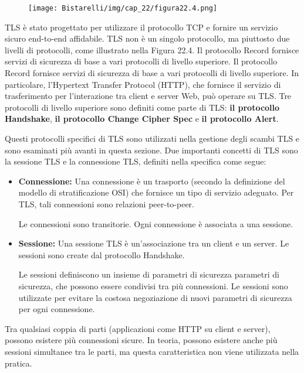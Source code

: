 \begin{figure}[H]
	\centering
    \texttt{[image: Bistarelli/img/cap\_22/figura22.4.png]}
\end{figure}

TLS è stato progettato per utilizzare il protocollo TCP e fornire un servizio sicuro end-to-end affidabile. TLS non è un singolo protocollo, ma piuttosto due livelli di protocolli, come illustrato nella Figura 22.4. Il protocollo Record fornisce servizi di sicurezza di base a vari protocolli di livello superiore. Il protocollo Record fornisce servizi di sicurezza di base a vari protocolli di livello superiore. In particolare, l'Hypertext Transfer Protocol (HTTP), che fornisce il servizio di trasferimento per l'interazione tra client e server Web, può operare su TLS. Tre protocolli di livello superiore sono definiti come parte di TLS: \textbf{il protocollo Handshake}, \textbf{il protocollo Change Cipher Spec} e \textbf{il protocollo Alert}. 

\singlespacing

Questi protocolli specifici di TLS sono utilizzati nella gestione degli scambi TLS e sono esaminati più avanti in questa sezione. Due importanti concetti di TLS sono la sessione TLS e la connessione TLS, definiti nella specifica come segue:
\begin{itemize}
    \item \textbf{Connessione:} Una connessione è un trasporto (secondo la definizione del modello di stratificazione OSI) che fornisce un tipo di servizio adeguato. Per TLS, tali connessioni sono relazioni peer-to-peer.
    
    Le connessioni sono transitorie. Ogni connessione è associata a una sessione.
    
    \item \textbf{Sessione:} Una sessione TLS è un'associazione tra un client e un server. Le sessioni sono create dal protocollo Handshake. 
    
    Le sessioni definiscono un insieme di parametri di sicurezza parametri di sicurezza, che possono essere condivisi tra più connessioni. Le sessioni sono utilizzate per evitare la costosa negoziazione di nuovi parametri di sicurezza per ogni connessione.
    
\end{itemize}
Tra qualsiasi coppia di parti (applicazioni come HTTP su client e server), possono esistere più connessioni sicure. In teoria, possono esistere anche più sessioni simultanee tra le parti, ma questa caratteristica non viene utilizzata nella pratica.
